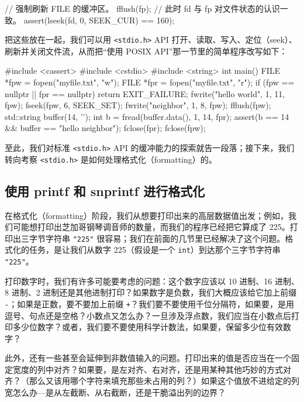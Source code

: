 \begin{codebox}[cpp]
    // 强制刷新 FILE 的缓冲区。
    fflush(fp);
    // 此时 fd 与 fp 对文件状态的认识一致。
    assert(lseek(fd, 0, SEEK_CUR) == 160);
\end{codebox}

把这些放在一起，我们可以用 \texttt{<stdio.\allowbreak{}h>\allowbreak{}} API 打开、读取、写入、定位（seek）、刷新并关闭文件流，从而把“使用 POSIX API”那一节里的简单程序改写如下：

\begin{codebox}[cpp]
    #include <cassert>
    #include <cstdio>
    #include <string>
    int main()
    {
      FILE *fpw = fopen("myfile.txt", "w");
      FILE *fpr = fopen("myfile.txt", "r");
      if (fpw == nullptr || fpr == nullptr)
        return EXIT_FAILURE;
      fwrite("hello world", 1, 11, fpw);
      fseek(fpw, 6, SEEK_SET);
      fwrite("neighbor", 1, 8, fpw);
      fflush(fpw);
      std::string buffer(14, '\0');
      int b = fread(buffer.data(), 1, 14, fpr);
      assert(b == 14 && buffer == "hello neighbor");
      fclose(fpr);
      fclose(fpw);
    }
\end{codebox}

至此，我们对标准 \texttt{<stdio.\allowbreak{}h>\allowbreak{}} API 的缓冲能力的探索就告一段落；接下来，我们转向考察 \texttt{<stdio.\allowbreak{}h>\allowbreak{}} 是如何处理格式化（formatting）的。

\subsection{使用 printf 和 snprintf 进行格式化}

在格式化（formatting）阶段，我们从想要打印出来的高层数据值出发；例如，我们可能想打印出芝加哥钢琴调音师的数量，而我们的程序已经把它算成了 225。打印出三字节字符串 \texttt{"225"} 很容易；我们在前面的几节里已经解决了这个问题。格式化的任务，是让我们从数字 225（假设是一个 \texttt{int}）到达那个三字节字符串 \texttt{"225"}。

打印数字时，我们有许多可能要考虑的问题：这个数字应该以 10 进制、16 进制、8 进制、2 进制还是其他进制打印？如果数字是负数，我们大概应该给它加上前缀 \texttt{-}；如果是正数，要不要加上前缀 \texttt{+}？我们要不要使用千位分隔符，如果要，是用逗号、句点还是空格？小数点又怎么办？一旦涉及浮点数，我们应当在小数点后打印多少位数字？或者，我们要不要使用科学计数法，如果要，保留多少位有效数字？

此外，还有一些甚至会延伸到非数值输入的问题。打印出来的值是否应当在一个固定宽度的列中对齐？如果要，是左对齐、右对齐，还是用某种其他巧妙的方式对齐？（那么又该用哪个字符来填充那些未占用的列？）如果这个值放不进给定的列宽怎么办—是从左截断、从右截断，还是干脆溢出列的边界？


